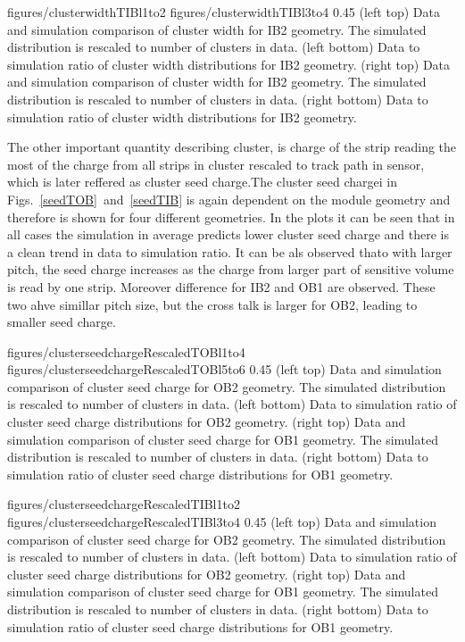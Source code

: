                  {figures/clusterwidthTIBl1to2}
                 {figures/clusterwidthTIBl3to4} %
                 {0.45}       %
                 {(left top) Data and simulation  comparison of cluster width for IB2 geometry. The simulated distribution is rescaled to number of clusters in data. (left bottom) Data to simulation ratio of cluster width distributions for IB2 geometry. (right top) Data and simulation  comparison of cluster width for IB2 geometry. The simulated distribution is rescaled to number of clusters in data. (right bottom) Data to simulation ratio of cluster width distributions for IB2 geometry. }

The other important quantity describing cluster, is charge of the strip reading the most of the charge from all strips in cluster rescaled to track path in sensor, which is later reffered as cluster seed charge.The cluster seed chargei in Figs.~\ref{seedTOB}~and~\ref{seedTIB} is again dependent on the module geometry and therefore is shown for four different geometries. In the plots it can be seen that in all cases the simulation in average predicts lower cluster seed charge and there is a clean trend in data to simulation ratio. It can be als observed thato with larger pitch, the seed charge increases as the charge from larger part of sensitive volume is read by one strip. Moreover difference for IB2 and OB1 are observed. These two ahve simillar pitch size, but the cross talk is larger for OB2, leading to smaller seed charge.

                 {figures/clusterseedchargeRescaledTOBl1to4}
                 {figures/clusterseedchargeRescaledTOBl5to6} %
                 {0.45}       %
                 {(left top) Data and simulation  comparison of cluster seed charge for OB2 geometry. The simulated distribution is rescaled to number of clusters in data. (left bottom) Data to simulation ratio of cluster seed charge distributions for OB2 geometry. (right top) Data and simulation  comparison of cluster seed charge for OB1 geometry. The simulated distribution is rescaled to number of clusters in data. (right bottom) Data to simulation ratio of cluster seed charge distributions for OB1 geometry. }

                 {figures/clusterseedchargeRescaledTIBl1to2}
                 {figures/clusterseedchargeRescaledTIBl3to4} %
                 {0.45}       %
                 {(left top) Data and simulation  comparison of cluster seed charge for OB2 geometry. The simulated distribution is rescaled to number of clusters in data. (left bottom) Data to simulation ratio of cluster seed charge distributions for OB2 geometry. (right top) Data and simulation  comparison of cluster seed charge for OB1 geometry. The simulated distribution is rescaled to number of clusters in data. (right bottom) Data to simulation ratio of cluster seed charge distributions for OB1 geometry. }

